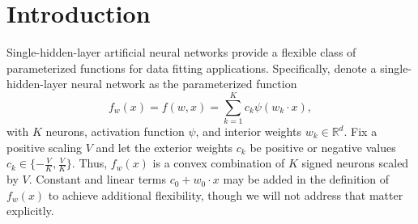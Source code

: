 \documentclass{article}
\numberwithin{equation}{section}
\theoremstyle{Lemma}
\theoremstyle{Corollary}
\theoremstyle{Theorem}
\theoremstyle{Remark}
\begin{document}


\begin{abstract}
This paper presents the study of a Bayesian estimation procedure for single-hidden-layer neural networks using $\ell_{1}$ controlled neuron weight vectors. We study the structure of the posterior density and provide a representation that makes it amenable to rapid sampling via Markov Chain Monte Carlo (MCMC). Let the neural network have $K$ neurons with internal weights of dimension $d$ and fix the outer weights. Thus there are $Kd$ parameters overall. With $N$ data observations, use a gain parameter or inverse temperature of $\beta$ in the posterior density for the internal weights.

The posterior is intrinsically multi-modal and not naturally suited to rapid mixing of direct MCMC algorithms. For a continuous uniform prior on the $\ell_{1}$ ball, we demonstrate that the posterior density can be written as a mixture density with suitably defined auxiliary random variables, where the mixture components are log-concave. Furthermore, when the total number of model parameters $Kd$ is large enough that $Kd \geq C(\beta N)^{2}$, the mixing distribution of the auxiliary random variables is also log-concave. Thus, neuron parameters can be sampled from the posterior by only sampling log-concave densities. The authors refer to the pairing of weights with such auxiliary random variables as a log-concave coupling.
\end{abstract}

\maketitle

\tableofcontents

\section{Introduction}
Single-hidden-layer artificial neural networks provide a flexible class of parameterized functions for data fitting applications. Specifically, denote a single-hidden-layer neural network as the parameterized function
\begin{equation}
    f_{w}(x) = f(w,x) = \sum_{k=1}^{K}c_{k}\psi(w_{k} \cdot x),\label{nn_def}
\end{equation}
with $K$ neurons, activation function $\psi$, and interior weights $w_{k} \in \mathbb{R}^{d}$. 
Fix a positive scaling $V$ and let the exterior weights $c_{k}$ be positive or negative values $c_{k} \in \{-\frac{V}{K},\frac{V}{K}\}$. Thus, $f_{w}(x)$ is a convex combination of $K$ signed neurons scaled by $V$. Constant and linear terms $c_0 + w_0 \cdot x$ may be added in the definition of $f_w(x)$ to achieve additional flexibility, though we will not address that matter explicitly.
\end{document}
